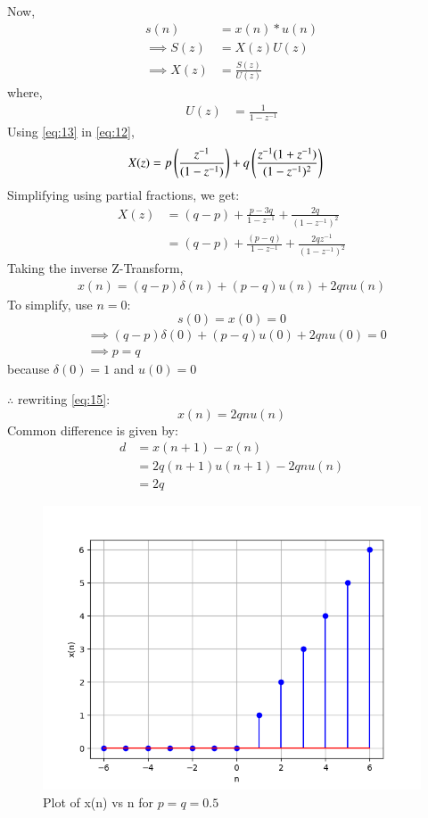 \documentclass[journal,12pt,twocolumn]{IEEEtran}
\theoremstyle{remark}
\begin{document}
Now, 
\begin{align}
    s(n) &= x(n) \ast u(n)\\
    \implies S(z) &= X(z)U(z)\\
    \implies X(z) &= \frac{S(z)}{U(z)}\label{eq:12}
\end{align}
where,
\begin{align}
    U(z) &= \frac{1}{1 - z^{-1}}\label{eq:13}
\end{align}
Using \eqref{eq:13} in \eqref{eq:12},
\begin{align}
    X(z) &= p\left(\frac{z^{-1}}{(1-z^{-1})}\right) + q\left(\frac{z^{-1}(1 + z^{-1})}{(1-z^{-1})^2}\right)
\end{align}
Simplifying using partial fractions, we get:
\begin{align}
    X(z) &= (q-p) + \frac{p-3q}{1-z^{-1}} + \frac{2q}{(1-z^{-1})^2}\\
    &= (q - p) + \frac{(p-q)}{1-z^{-1}} + \frac{2qz^{-1}}{(1-z^{-1})^2}
\end{align}
Taking the inverse Z-Transform,
\begin{align}
    x(n) = (q-p)\delta(n) + (p-q)u(n) + 2qnu(n)\label{eq:15}
\end{align}
To simplify, use $n=0$:
\begin{equation}
    s(0) = x(0) = 0
\end{equation}
\begin{align}
    &\implies (q-p)\delta(0) + (p-q)u(0) + 2qnu(0) = 0\\
    &\implies p = q
\end{align}
because $\delta(0) = 1$ and $u(0) = 0$

$\therefore$ rewriting \eqref{eq:15}:
\begin{equation}
    x(n) = 2qnu(n)
\end{equation}
Common difference is given by:
\begin{align}
    d &= x(n+1) - x(n)\\
    &= 2q(n+1)u(n+1) - 2qnu(n)\\
    &= 2q
\end{align}
\begin{figure}[!h]
    \centering
    \includegraphics[width = \columnwidth]{figs/x_plot.png}
    \caption{Plot of x(n) vs n for $p=q=0.5$}
    \label{fig:1}
\end{figure}
\end{document}
